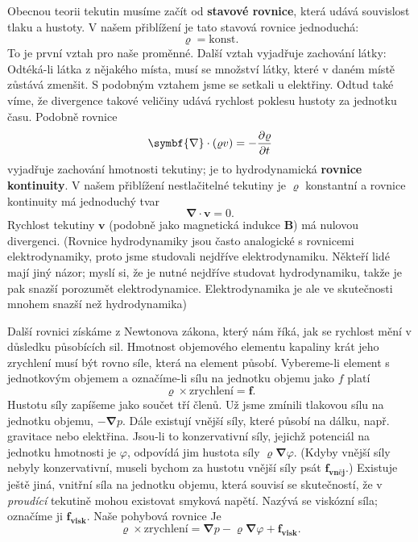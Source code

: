 {    Obecnou teorii tekutin musíme začít od \textbf{stavové rovnice}, která udává souvislost tlaku a 
    hustoty. V našem přiblížení je tato stavová rovnice jednoduchá:
    \begin{equation*}
      \varrho = \text{konst}.
    \end{equation*}
    To je první vztah pro naše proměnné. Další vztah vyjadřuje zachování látky: Odtéká-li látka z 
    nějakého místa, musí se množství látky, které v daném místě zůstává zmenšit. S podobným vztahem 
    jsme se setkali u elektřiny. Odtud také víme, že divergence takové veličiny udává rychlost 
    poklesu hustoty za jednotku času. Podobně rovnice
    \begin{equation}\label{fyz:eq547}
      \symbf{\nabla}\cdot(\varrho v) = -\pder{\varrho}{t}
    \end{equation}
    vyjadřuje zachování hmotnosti tekutiny; je to hydrodynamická \textbf{rovnice kontinuity}. V 
    našem přiblížení nestlačitelné tekutiny je \(\varrho\) konstantní a rovnice kontinuity má 
    jednoduchý tvar
    \begin{equation}\label{fyz:eq548}
      \symbf{\nabla}\cdot\bm{v} = 0.
    \end{equation}
    Rychlost tekutiny \(\bm{v}\) (podobně jako magnetická indukce \(\bm{B}\)) má nulovou 
    divergenci. (Rovnice hydrodynamiky jsou často analogické s rovnicemi elektrodynamiky, proto 
    jsme studovali nejdříve elektrodynamiku. Někteří lidé mají jiný názor; myslí si, že je nutné 
    nejdříve studovat hydrodynamiku, takže je pak snazší porozumět elektrodynamice. Elektrodynamika 
    je ale ve skutečnosti mnohem snazší než hydrodynamika)
    
    Další rovnici získáme z Newtonova zákona, který nám říká, jak se rychlost mění v důsledku 
    působících sil. Hmotnost objemového elementu kapaliny krát jeho zrychlení musí být rovno síle, 
    která na element působí. Vybereme-li element s jednotkovým objemem a označíme-li sílu na 
    jednotku objemu jako \(f\) platí
    \begin{equation*}
      \varrho\times\text{zrychlení} = \bm{f}.
    \end{equation*}
    Hustotu síly zapíšeme jako součet tří členů. Už jsme zmínili tlakovou sílu na jednotku objemu, 
    \(-\symbf{\nabla}p\). Dále existují vnější síly, které působí na dálku, např. gravitace nebo 
    elektřina. Jsou-li to konzervativní síly, jejichž potenciál na jednotku hmotnosti je 
    \(\varphi\), odpovídá jim hustota síly \(\varrho\symbf{\nabla}\varphi\). (Kdyby vnější síly 
    nebyly konzervativní, museli bychom za hustotu vnější síly psát \(\bm{f_{\text{vněj}}}\).) 
    Existuje ještě jiná, vnitřní síla na jednotku objemu, která souvisí se skutečností, že v 
    \emph{proudící} tekutině mohou existovat smyková napětí. Nazývá se viskózní síla; označíme ji 
    \(\bm{f_{\text{visk}}}\). Naše pohybová rovnice Je
    \begin{equation}\label{fyz:eq549}
      \varrho\times\text{zrychlení} = 
        \symbf{\nabla}p - \varrho\symbf{\nabla}\varphi + \bm{f_{visk}}.
    \end{equation}
    
}
